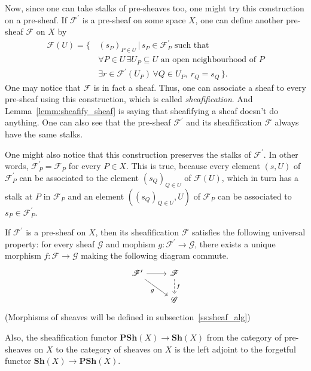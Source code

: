 Now, since one can take stalks of pre-sheaves too, one might try this
construction on a pre-sheaf. If $\mathscr{F}^{\prime}$ is a pre-sheaf
on some space $X$, one can define another pre-sheaf $\mathscr{F}$
on $X$ by
\begin{align*}
  \mathscr{F}(U)=\big\{\,
  & (s_{P})_{P\in U}\,\big\vert\, s_{P}\in\mathscr{F}_{P}^{\prime}
    \text{ such that} \\
  & \forall P\in U\,
    \exists U_{P}\subseteq U\text{ an open neighbourhood of }P \\
  & \exists r\in\mathscr{F}^{\prime}(U_{P})\,\forall Q\in U_{P},
    \ r_{Q}=s_{Q}\,\big\}.
\end{align*}
One may notice that $\mathscr{F}$ is in fact a sheaf. Thus, one can
associate a sheaf to every pre-sheaf using this construction, which is
called \emph{sheafification}. And Lemma~\ref{lemm:sheafify_sheaf} is saying
that sheafifying a sheaf doesn't do anything. One can also see that the
pre-sheaf $\mathscr{F}^{\prime}$ and its sheafification $\mathscr{F}$ always
have the same stalks.
\begin{rem}
  One might also notice that this construction preserves the stalks of
  $\mathscr{F}^{\prime}$. In other words, $\mathscr{F}^{\prime}_{P}
  =\mathscr{F}_{P}$ for every $P\in X$. This is true, because every
  element $(s, U)$ of $\mathscr{F}^{\prime}_{P}$ can be associated to
  the element $(s_{Q})_{Q\in U}$ of $\mathscr{F}(U)$, which in turn has
  a stalk at $P$ in $\mathscr{F}_{P}$ and an element $((s_{Q})_{Q\in U},
  U)$ of $\mathscr{F}_{P}$ can be associated to $s_{P}\in
  \mathscr{F}^{\prime}_{P}$.
\end{rem}
\begin{cat}
  If $\mathscr{F}^{\prime}$ is a pre-sheaf on $X$, then its sheafification
  $\mathscr{F}$ satisfies the following universal property: for every sheaf
  $\mathscr{G}$ and mophism $g:\mathscr{F}^{\prime}\to\mathscr{G}$, there
  exists a unique morphism $f:\mathscr{F}\to\mathscr{G}$ making the following
  diagram commute.
  \[\begin{tikzcd}
      \mathscr{F}^{\prime}\rar\arrow[dr, "g"'] & \mathscr{F}
      \arrow[d, dashed, "f"] \\ & \mathscr{G}
    \end{tikzcd}\]
  (Morphisms of sheaves will be defined in subsection~\ref{ss:sheaf_alg})

  Also, the sheafification functor $\mathbf{PSh}(X)\to\mathbf{Sh}(X)$
  from the category of pre-sheaves on $X$ to the category of sheaves on $X$
  is the left adjoint to the forgetful functor $\mathbf{Sh}(X)\to
  \mathbf{PSh}(X)$. %
\end{cat}
